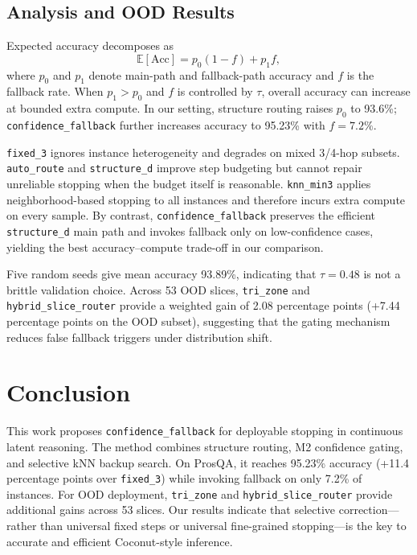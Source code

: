\documentclass{article}
\begin{document}
\subsection{Analysis and OOD Results}

Expected accuracy decomposes as
\[
\mathbb{E}[\mathrm{Acc}]=p_0(1-f)+p_1 f,
\]
where $p_0$ and $p_1$ denote main-path and fallback-path accuracy and $f$ is the fallback rate. When $p_1>p_0$ and $f$ is controlled by $\tau$, overall accuracy can increase at bounded extra compute. In our setting, structure routing raises $p_0$ to 93.6\%; \texttt{confidence\_fallback} further increases accuracy to 95.23\% with $f=7.2\%$.

\texttt{fixed\_3} ignores instance heterogeneity and degrades on mixed 3/4-hop subsets. \texttt{auto\_route} and \texttt{structure\_d} improve step budgeting but cannot repair unreliable stopping when the budget itself is reasonable. \texttt{knn\_min3} applies neighborhood-based stopping to all instances and therefore incurs extra compute on every sample. By contrast, \texttt{confidence\_fallback} preserves the efficient \texttt{structure\_d} main path and invokes fallback only on low-confidence cases, yielding the best accuracy--compute trade-off in our comparison.

Five random seeds give mean accuracy 93.89\%, indicating that $\tau=0.48$ is not a brittle validation choice. Across 53 OOD slices, \texttt{tri\_zone} and \texttt{hybrid\_slice\_router} provide a weighted gain of 2.08 percentage points (+7.44 percentage points on the OOD subset), suggesting that the gating mechanism reduces false fallback triggers under distribution shift.

\section{Conclusion}

This work proposes \texttt{confidence\_fallback} for deployable stopping in continuous latent reasoning. The method combines structure routing, M2 confidence gating, and selective kNN backup search. On ProsQA, it reaches 95.23\% accuracy (+11.4 percentage points over \texttt{fixed\_3}) while invoking fallback on only 7.2\% of instances. For OOD deployment, \texttt{tri\_zone} and \texttt{hybrid\_slice\_router} provide additional gains across 53 slices. Our results indicate that selective correction---rather than universal fixed steps or universal fine-grained stopping---is the key to accurate and efficient Coconut-style inference.



\end{document}
